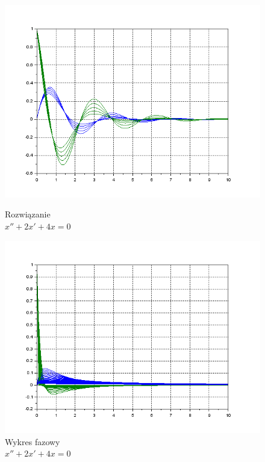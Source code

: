 \documentclass[12pt]{article}
\begin{document}
\begin{figure}[H]
  \centering
  \hspace{-1.6cm}
  \begin{minipage}[b]{0.49\textwidth}
    \includegraphics[scale=0.47]{./img/5-zespolone-xy-01}
    \caption{Rozwiązanie \\ \centering $x''+2x'+4x=0$}
  \end{minipage}
  \hfill
  \begin{minipage}[b]{0.49\textwidth}
    \includegraphics[scale=0.47]{./img/5-rzeczywiste-xy-01}
    \caption{Wykres fazowy \\
    \centering $x''+2x'+4x=0$}
  \end{minipage}
\end{figure}
\end{document}
